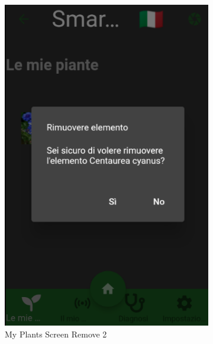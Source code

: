 \documentclass[a4paper,12pt]{report}
\begin{document}
\begin{figure}[H]
\begin{subfigure}{0.3\textwidth}
		\includegraphics[width=\textwidth]{./images/my_plants/my_plants_screen3_remove2.png}
		\caption{My Plants Screen Remove 2}
		\label{fig:my_plants_remove2}
	\end{subfigure}
	\hfill
	\begin{subfigure}{0.3\textwidth}

\end{subfigure}
\end{figure}
\end{document}
